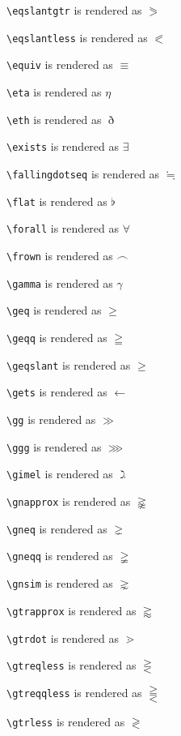 \texttt{\textbackslash eqslantgtr} is rendered as $\eqslantgtr$

\texttt{\textbackslash eqslantless} is rendered as $\eqslantless$

\texttt{\textbackslash equiv} is rendered as $\equiv$

\texttt{\textbackslash eta} is rendered as $\eta$

\texttt{\textbackslash eth} is rendered as $\eth$

\texttt{\textbackslash exists} is rendered as $\exists$

\texttt{\textbackslash fallingdotseq} is rendered as $\fallingdotseq$

\texttt{\textbackslash flat} is rendered as $\flat$

\texttt{\textbackslash forall} is rendered as $\forall$

\texttt{\textbackslash frown} is rendered as $\frown$

\texttt{\textbackslash gamma} is rendered as $\gamma$

\texttt{\textbackslash geq} is rendered as $\geq$

\texttt{\textbackslash geqq} is rendered as $\geqq$

\texttt{\textbackslash geqslant} is rendered as $\geqslant$

\texttt{\textbackslash gets} is rendered as $\gets$

\texttt{\textbackslash gg} is rendered as $\gg$

\texttt{\textbackslash ggg} is rendered as $\ggg$

\texttt{\textbackslash gimel} is rendered as $\gimel$

\texttt{\textbackslash gnapprox} is rendered as $\gnapprox$

\texttt{\textbackslash gneq} is rendered as $\gneq$

\texttt{\textbackslash gneqq} is rendered as $\gneqq$

\texttt{\textbackslash gnsim} is rendered as $\gnsim$

\texttt{\textbackslash gtrapprox} is rendered as $\gtrapprox$

\texttt{\textbackslash gtrdot} is rendered as $\gtrdot$

\texttt{\textbackslash gtreqless} is rendered as $\gtreqless$

\texttt{\textbackslash gtreqqless} is rendered as $\gtreqqless$

\texttt{\textbackslash gtrless} is rendered as $\gtrless$

